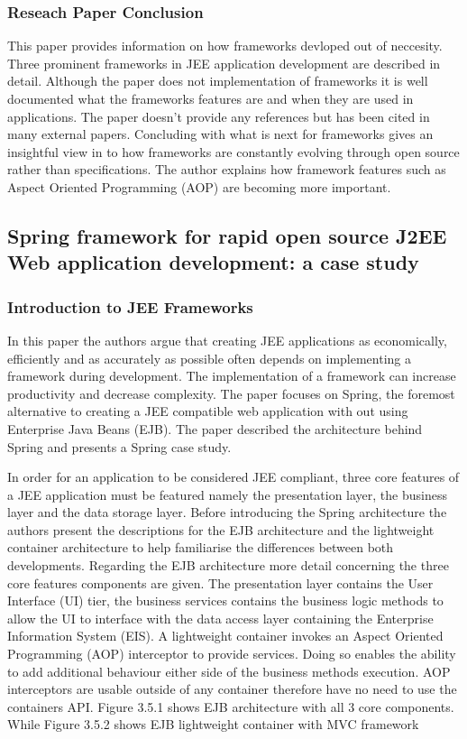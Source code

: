 \documentclass{article}
\begin{document}
		\subsubsection{Reseach Paper Conclusion}
		This paper provides information on how frameworks devloped out of neccesity. Three prominent frameworks in JEE application development are described in detail. Although the paper does not implementation of frameworks it is well documented what the frameworks features are and when they are used in applications. The paper doesn't provide any references but has been cited in many external papers. Concluding with what is next for frameworks gives an insightful view in to how frameworks are constantly evolving through open source rather than specifications. The author explains how framework features such as Aspect Oriented Programming (AOP) are becoming more important.

	\subsection{Spring framework for rapid open source J2EE Web application development: a case study}
	
		\subsubsection{Introduction to JEE Frameworks}
		In this paper the authors argue that creating JEE applications as economically, efficiently and as accurately as possible often depends on implementing a framework during development. The implementation of a framework can increase productivity and decrease complexity\cite{experteoneonone}. The paper focuses on Spring, the foremost alternative to creating a JEE compatible web application with out using Enterprise Java Beans (EJB). The paper described the architecture behind Spring and presents a Spring case study.

		In order for an application to be considered JEE compliant, three core features of a JEE application must be featured namely the presentation layer, the business layer and the data storage layer. Before introducing the Spring architecture the authors present the descriptions for the EJB architecture and the lightweight container architecture to help familiarise the differences between both developments. Regarding the EJB architecture more detail concerning the three core features components are given. The presentation layer contains the User Interface (UI) tier, the business services contains the business logic methods to allow the UI to interface with the data access layer containing the Enterprise Information System (EIS). A lightweight container invokes an Aspect Oriented Programming (AOP) interceptor to provide services. Doing so enables the ability to add additional behaviour either side of the business methods execution. AOP interceptors are usable outside of any container therefore have no need to use the containers API. Figure 3.5.1 shows EJB architecture with all 3 core components. While Figure 3.5.2 shows EJB lightweight container with MVC framework
				
\end{document}
